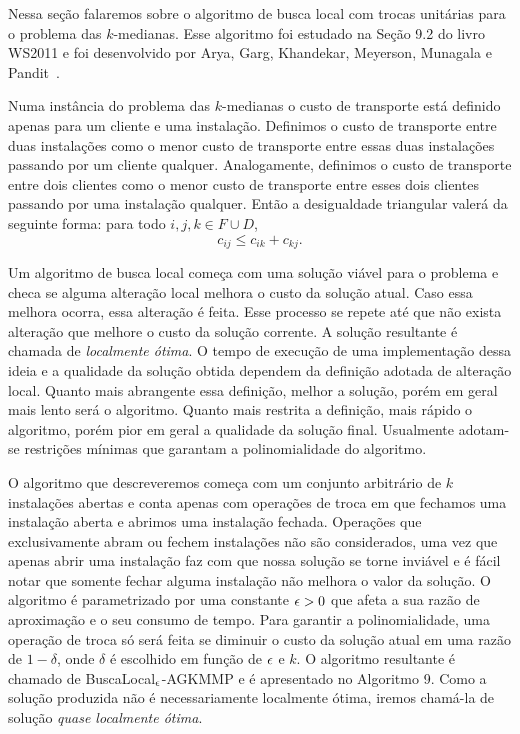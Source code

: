 Nessa seção falaremos sobre o algoritmo de busca local com trocas unitárias para o problema das $k$-medianas. Esse algoritmo foi estudado na Seção 9.2 do livro WS2011 e foi desenvolvido por Arya, Garg, Khandekar, Meyerson, Munagala e Pandit~\cite{AryaLocal}.

Numa instância do problema das $k$-medianas o custo de transporte está definido apenas para um cliente e uma instalação.
Definimos o custo de transporte entre duas instalações como o menor custo de transporte entre essas duas instalações passando por um cliente qualquer. Analogamente, definimos o custo de transporte entre dois clientes como o menor custo de transporte entre esses dois clientes passando por uma instalação qualquer. Então a desigualdade triangular valerá da seguinte forma: para todo $i,j,k \in F \cup D$,
\[ c_{ij} \leq c_{ik} + c_{kj}.\]

Um algoritmo de busca local começa com uma solução viável para o problema e checa se alguma alteração local melhora o custo da solução atual. Caso essa melhora ocorra, essa alteração é feita. Esse processo se repete até que não exista alteração que melhore o custo da solução corrente. A solução resultante é chamada de \emph{localmente ótima}. O tempo de execução de uma implementação dessa ideia e a qualidade da solução obtida dependem da definição adotada de alteração local. Quanto mais abrangente essa definição, melhor a solução, porém em geral mais lento será o algoritmo. Quanto mais restrita a definição, mais rápido o algoritmo, porém pior em geral a qualidade da solução final. Usualmente adotam-se restrições mínimas que garantam a polinomialidade do algoritmo.

O algoritmo que descreveremos começa com um conjunto arbitrário de $k$ instalações abertas e conta apenas com operações de troca em que fechamos uma instalação aberta e abrimos uma instalação fechada. Operações que exclusivamente abram ou fechem instalações não são considerados, uma vez que apenas abrir uma instalação faz com que nossa solução se torne inviável e é fácil notar que somente fechar alguma instalação não melhora o valor da solução. O algoritmo é parametrizado por uma constante $\epsilon > 0$ que afeta a sua razão de aproximação e o seu consumo de tempo. Para garantir a polinomialidade, uma operação de troca só será feita se diminuir o custo da solução atual em uma razão de $1-\delta$, onde $\delta$ é escolhido em função de $\epsilon$ e $k$. O algoritmo resultante é chamado de {\sc BuscaLocal$_\epsilon$-AGKMMP} e é apresentado no Algoritmo 9. Como a solução produzida não é necessariamente localmente ótima, iremos chamá-la de solução \emph{quase localmente ótima}.

